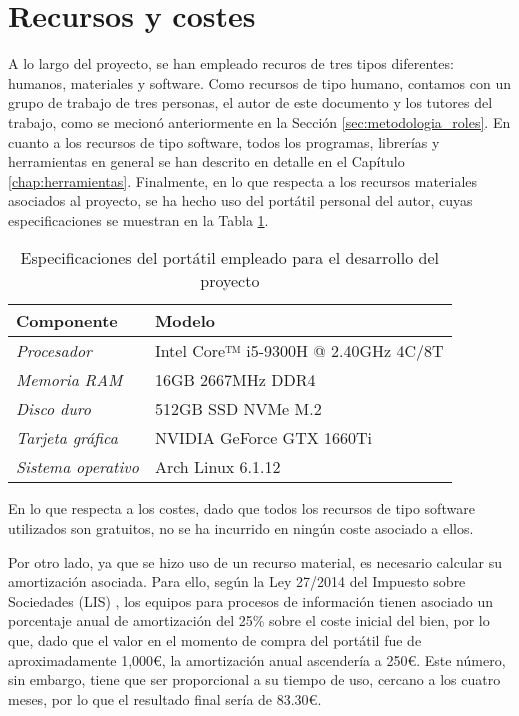 \section{Recursos y costes}
\label{sec:planificacion_costes}

A lo largo del proyecto, se han empleado recuros de tres tipos diferentes: humanos, materiales y software.
Como recursos de tipo humano,
contamos con un grupo de trabajo de tres personas, el autor de este documento y los tutores del trabajo,
como se mecionó anteriormente en la Sección \ref{sec:metodologia_roles}.
En cuanto a los recursos de tipo software, todos los programas, librerías y herramientas en general
se han descrito en detalle en el Capítulo \ref{chap:herramientas}.
Finalmente, en lo que respecta a los recursos materiales asociados al proyecto, se ha hecho uso del portátil personal del autor,
cuyas especificaciones se muestran en la Tabla \ref{tab:costes_hardware}.

\bigskip
\begin{table}[H]
	\centering
	\begin{tabular}{|l|l|}
		\rowcolor{udcpink!25}
		\hline
		\small \textbf{Componente}        & \small \textbf{Modelo}                      \\ \hline
		\small \textit{Procesador}        & \small Intel Core™ i5-9300H @ 2.40GHz 4C/8T \\ \hline
		\small \textit{Memoria RAM}       & \small 16GB 2667MHz DDR4                    \\ \hline
		\small \textit{Disco duro}        & \small 512GB SSD NVMe M.2                   \\ \hline
		\small \textit{Tarjeta gráfica}   & \small NVIDIA GeForce GTX 1660Ti            \\ \hline
		\small \textit{Sistema operativo} & \small Arch Linux 6.1.12                    \\ \hline
	\end{tabular}
	\caption{Especificaciones del portátil empleado para el desarrollo del proyecto}
	\label{tab:costes_hardware}
\end{table}

\bigskip
En lo que respecta a los costes, dado que todos los recursos de tipo software utilizados son gratuitos, no se ha incurrido en ningún coste
asociado a ellos.

\bigskip
Por otro lado, ya que se hizo uso de un recurso material,
es necesario calcular su amortización asociada. Para ello, según la Ley 27/2014 del Impuesto sobre Sociedades (LIS) \cite{leysociedades},
los equipos para procesos de información tienen asociado un porcentaje anual de amortización del 25\% sobre el coste inicial del bien,
por lo que, dado que el valor en el momento de compra del portátil fue de aproximadamente 1,000€, la amortización anual ascendería a 250€. Este número, sin embargo,
tiene que ser proporcional a su tiempo de uso, cercano a los cuatro meses, por lo que el resultado final sería de 83.30€.

